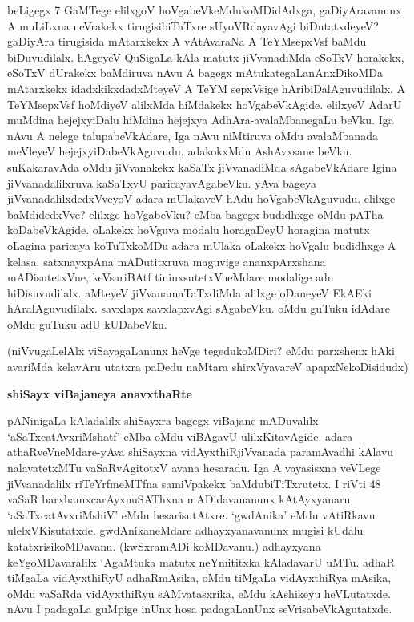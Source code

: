 \noindent
beLigegx 7 GaMTege elilxgoV hoVgabeVkeMdukoMDidAdxga, gaDiyAravanunx A muLiLxna neVrakekx tirugisibiTaTxre sUyoVRdayavAgi biDutatxdeyeV? gaDiyAra tirugisida mAtarxkekx A vAtAvaraNa A TeYMsepxVsf baMdu biDuvudilalx. hAgeyeV QuSigaLa kAla matutx jiVvanadiMda eSoTxV horakekx, eSoTxV dUrakekx baMdiruva nAvu A bagegx mAtukategaLanAnxDikoMDa mAtarxkekx idadxkikxdadxMteyeV A TeYM sepxVsige hAribiDalAguvudilalx. A TeYMsepxVsf hoMdiyeV alilxMda hiMdakekx hoVgabeVkAgide. elilxyeV AdarU muMdina hejejxyiDalu hiMdina hejejxya AdhAra-avalaMbanegaLu beVku. Iga nAvu A nelege talupabeVkAdare, Iga nAvu niMtiruva oMdu avalaMbanada meVleyeV hejejxyiDabeVkAguvudu, adakokxMdu AshAvxsane beVku. suKakaravAda oMdu jiVvanakekx kaSaTx jiVvanadiMda sAgabeVkAdare Igina jiVvanadalilxruva kaSaTxvU paricayavAgabeVku. yAva bageya jiVvanadalilxdedxVveyoV adara mUlakaveV hAdu 
hoVgabeVkAguvudu. elilxge baMdidedxVve? elilxge hoVgabeVku? eMba bagegx budidhxge oMdu pATha koDabeVkAgide. oLakekx hoVguva modalu horagaDeyU horagina matutx oLagina paricaya koTuTxkoMDu adara mUlaka oLakekx hoVgalu budidhxge A kelasa. satxnayxpAna mADutitxruva maguvige ananxpArxshana mADisutetxVne, keVsariBAtf tininxsutetxVneMdare modalige adu hiDisuvudilalx. aMteyeV jiVvanamaTaTxdiMda alilxge oDaneyeV EkAEki hAralAguvudilalx. savxlapx savxlapxvAgi sAgabeVku. oMdu guTuku idAdare oMdu guTuku adU kUDabeVku.

(niVvugaLelAlx viSayagaLanunx heVge tegedukoMDiri? eMdu parxshenx hAki avariMda kelavAru utatxra paDedu naMtara shirxVyavareV apapxNekoDisidudx)

{\bigskip
\noindent
{\large\bf shiSayx viBajaneya anavxthaRte}}\label{page126a}
\medskip

\noindent
pANinigaLa kAladalilx-shiSayxra bagegx viBajane mADuvalilx `aSaTxcatAvxriMshatf' eMba oMdu viBAgavU ulilxKitavAgide. adara athaRveVneMdare-yAva shiSayxna vidAyxthiRjiVvanada paramAvadhi kAlavu nalavatetxMTu vaSaRvAgitotxV avana hesaradu. Iga A vayasisxna veVLege jiVvanadalilx riTeYrfmeMTfna samiVpakekx baMdubiTiTxrutetx. I riVti 48 vaSaR barxhamxcarAyxnuSAThxna mADidavananunx kAtAyxyanaru `aSaTxcatAvxriMshiV' eMdu hesarisutAtxre. `gwdAnika' eMdu vAtiRkavu ulelxVKisutatxde. gwdAnikaneMdare adhayxyanavanunx mugisi kUdalu katatxrisikoMDavanu. (kwSxramADi koMDavanu.) adhayxyana keYgoMDavaralilx `AgaMtuka matutx neYmititxka kAladavarU uMTu. adhaR tiMgaLa vidAyxthiRyU adhaRmAsika, oMdu tiMgaLa vidAyxthiRya mAsika, oMdu vaSaRda vidAyxthiRyu sAMvatasxrika, eMdu kAshikeyu heVLutatxde. nAvu I padagaLa guMpige inUnx hosa padagaLanUnx seVrisabeVkAgutatxde.

